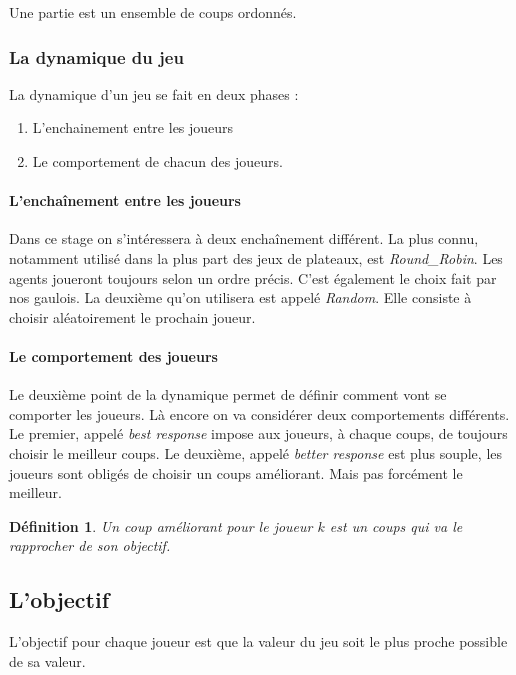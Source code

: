 \documentclass[11pt]{article}
\theoremstyle{defi}
\newtheorem{definition}{Définition}[section]
\theoremstyle{not}
\theoremstyle{prob}
\begin{document}
      Une partie est un ensemble de coups ordonnés.

      \subsubsection{La dynamique du jeu}
        La dynamique d'un jeu se fait en deux phases :
        \begin{enumerate}
          \item L'enchainement entre les joueurs
          \item Le comportement de chacun des joueurs.
        \end{enumerate}

        \paragraph{L'enchaînement entre les joueurs}
          Dans ce stage on s'intéressera à deux enchaînement différent.
          La plus connu, notamment utilisé dans la plus part des jeux de plateaux, est \emph{Round\_Robin}.
          Les agents joueront toujours selon un ordre précis. C'est également le choix fait par nos gaulois.
          La deuxième qu'on utilisera est appelé \emph{Random}. Elle consiste à choisir aléatoirement le prochain joueur.

        \paragraph{Le comportement des joueurs}
          Le deuxième point de la dynamique permet de définir comment vont se comporter les joueurs. Là encore on va considérer deux comportements différents.
          Le premier, appelé \emph{best response} impose aux joueurs, à chaque coups, de toujours choisir le meilleur coups.
          Le deuxième, appelé \emph{better response} est plus souple, les joueurs sont obligés de choisir un coups améliorant.
          Mais pas forcément le meilleur.

        \begin{definition}
          Un coup améliorant pour le joueur $k$ est un coups qui va le rapprocher de son objectif.
        \end{definition}

    \subsection{L'objectif}
      L'objectif pour chaque joueur est que la valeur du jeu soit le plus proche possible de sa valeur.
\end{document}
